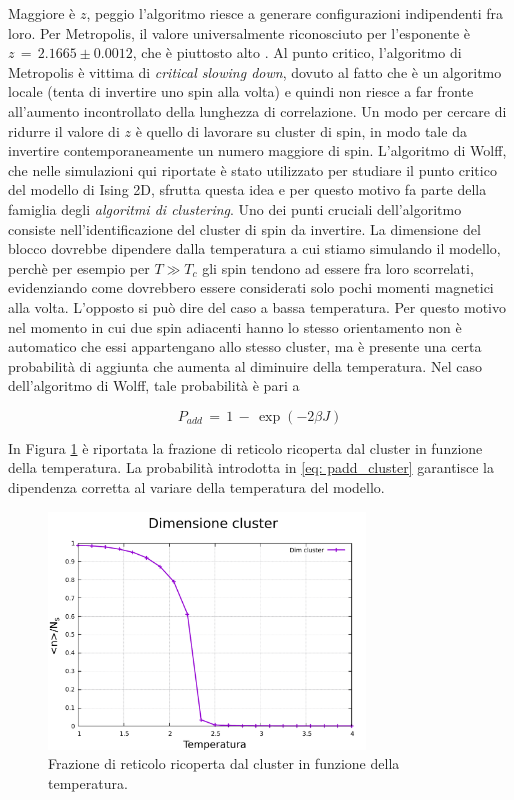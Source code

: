 Maggiore è $z$, peggio l'algoritmo riesce a generare configurazioni indipendenti fra loro. Per Metropolis, il valore universalmente 
riconosciuto per l'esponente è $z\,=\,2.1665 \pm 0.0012$, che è piuttosto alto \cite{MCM}. Al punto critico, l'algoritmo di Metropolis è vittima 
di \textit{critical slowing down}, dovuto al fatto che è un algoritmo locale (tenta di invertire uno spin alla volta) e quindi non 
riesce a far fronte all'aumento incontrollato della lunghezza di correlazione. Un modo per cercare di ridurre il valore di $z$ è quello 
di lavorare su cluster di spin, in modo tale da invertire contemporaneamente un numero maggiore di spin. L'algoritmo di Wolff, che nelle 
simulazioni qui riportate è stato utilizzato per studiare il punto critico del modello di Ising 2D, sfrutta questa idea e per questo 
motivo fa parte della famiglia degli \textit{algoritmi di clustering}. Uno dei punti cruciali dell'algoritmo consiste nell'identificazione 
del cluster di spin da invertire. La dimensione del blocco dovrebbe dipendere dalla temperatura a cui stiamo simulando il modello, perchè 
per esempio per $T \gg T_c$ gli spin tendono ad essere fra loro scorrelati, evidenziando come dovrebbero essere considerati solo pochi 
momenti magnetici alla volta. L'opposto si può dire del caso a bassa temperatura. Per questo motivo nel momento in cui due spin adiacenti 
hanno lo stesso orientamento non è automatico che essi appartengano allo stesso cluster, ma è presente una certa probabilità di aggiunta 
che aumenta al diminuire della temperatura. Nel caso dell'algoritmo di Wolff, tale probabilità è pari a 

\begin{equation}
    P_{add}\,=\,1\,-\,\exp{\left(-2\beta J\right)}
    \label{eq: padd_cluster}
\end{equation}

In Figura \ref{fig: dim_clW} è riportata la frazione di reticolo ricoperta dal cluster in funzione della temperatura. La probabilità 
introdotta in \eqref{eq: padd_cluster} garantisce la dipendenza corretta al variare della temperatura del modello.

\begin{figure}[H]
    \centering
    \includegraphics[width=0.75\textwidth]{Immagini/MC_meth/dim_clW.pdf}
    \caption{Frazione di reticolo ricoperta dal cluster in funzione della temperatura.}
    \label{fig: dim_clW}
\end{figure}

